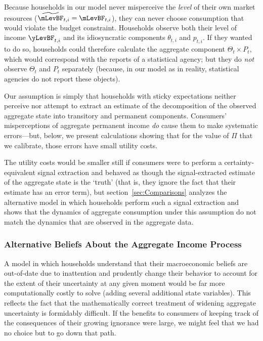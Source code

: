 Because households in our model never misperceive the \textit{level} of their own market resources ($\perc{\mLevBF}_{t,i}=\mLevBF_{t,i}$), they can never choose consumption that would violate the budget constraint.  Households observe both their level of income $\yLevBF_{t,i}$ and its idiosyncratic components $\theta_{t,i}$ and ${p}_{t,i}$. If they wanted to do so, households could therefore calculate the aggregate component $\Theta_{t}\times {P}_{t}$, which would correspond with the reports of a statistical agency; but they do \textit{not} observe $\Theta_{t}$ and ${P}_{t}$ separately (because, in our model as in reality, statistical agencies do not report these objects).

Our assumption is simply that households with sticky expectations neither perceive nor attempt to extract an estimate of the decomposition of the observed aggregate state into transitory and permanent components.  Consumers' misperceptions of aggregate permanent income \textit{do} cause them to make systematic errors---but, below, we present calculations showing that for the value of $\Pi$ that we calibrate, those errors have small utility costs.

The utility costs would be smaller still if consumers were to perform a certainty-equivalent signal extraction and behaved as though the signal-extracted estimate of the aggregate state is the `truth' (that is, they ignore the fact that their estimate has an error term), but section~\ref{sec:Comparisons} analyzes the alternative model in which households perform such a signal extraction and shows that the dynamics of aggregate consumption under this assumption do not match the dynamics that are observed in the aggregate data.

\hypertarget{AltBeliefs}{}
\subsubsection{Alternative Beliefs About the Aggregate Income Process}
A model in which households understand that their macroeconomic beliefs are out-of-date due to inattention and prudently change their behavior to account for the extent of their uncertainty at any given moment would be far more computationally costly to solve (adding several additional state variables).  This reflects the fact that the mathematically correct treatment of widening aggregate uncertainty is formidably difficult.  If the benefits to consumers of keeping track of the consequences of their growing ignorance were large, we might feel that we had no choice but to go down that path.

